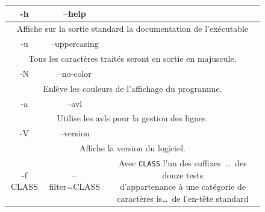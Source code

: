 \documentclass[12pt]{article}
\begin{document}
    \begin{table}[H]
        \begin{figure}[H]   
            \centering
            \begin{tabular}{|c|c|c|}
                \hline
                    \cellcolor{blue-s!25} -h & \cellcolor{blue-s!25} --help  &
                    \cellcolor{blue-t!70}\\
                \hline
                    \multicolumn{3}{|c|}{\cellcolor{blue-u!7}Affiche sur 
                    la sortie standard la documentation de l'exécutable}\\
                \hline
                    \cellcolor{blue-s!25} -u  & \cellcolor{blue-s!25} 
                    --uppercasing 
                    & \cellcolor{blue-t!70} \\
                \hline
                    \multicolumn{3}{|c|}{\cellcolor{blue-u!7}Tous les caractères 
                    traités seront en sortie en majuscule.}\\
                \hline 
                    \cellcolor{blue-s!25} -N & \cellcolor{blue-s!25} --no-color 
                    & \cellcolor{blue-t!70} \\
                \hline
                    \multicolumn{3}{|c|}{\cellcolor{blue-u!7}Enlève les couleurs 
                    de l'affichage du programme.}\\
                \hline
                    \cellcolor{blue-s!25} -a & \cellcolor{blue-s!25} --avl & 
                    \cellcolor{blue-t!70} \\
                \hline
                    \multicolumn{3}{|c|}{\cellcolor{blue-u!7}Utilise les avls 
                    pour la gestion des lignes.}\\
                \hline
                    \cellcolor{blue-s!25} -V & \cellcolor{blue-s!25} --version & 
                    \cellcolor{blue-t!70} \\
                \hline
                    \multicolumn{3}{|c|}{\cellcolor{blue-u!7}Affiche la version 
                    du logiciel.}\\
                \hline
                    \cellcolor{blue-s!25} -f CLASS & \cellcolor{blue-s!25} 
                    --filter=CLASS & \rule{0pt}{2.6em}\cellcolor{blue-s!25}
                    {\parbox{9cm}{ Avec \texttt{CLASS} l’un 
                    des suffixes~\ldots~des douze tests\\ d’appartenance à une 
                    catégorie de caractères is\ldots~de l’en-tête standard 
}}
\end{tabular}
\end{figure}
\end{table}
\end{document}
